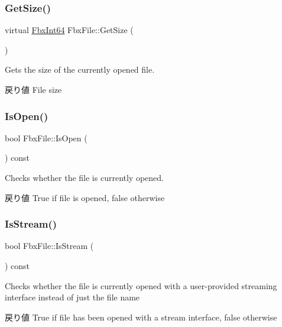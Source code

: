 \subsubsection{\texorpdfstring{Get\+Size()}{GetSize()}}
{\footnotesize\ttfamily virtual \hyperlink{fbxtypes_8h_ac7e1334c7c6aacc9c8a9dccddebb4368}{Fbx\+Int64} Fbx\+File\+::\+Get\+Size (\begin{DoxyParamCaption}{ }\end{DoxyParamCaption})\hspace{0.3cm}{\ttfamily [virtual]}}

Gets the size of the currently opened file. \begin{DoxyReturn}{戻り値}
File size 
\end{DoxyReturn}
\mbox{\label{class_fbx_file_acf436397d99f8b7fb5baf5b32eac26b1}} 
\subsubsection{\texorpdfstring{Is\+Open()}{IsOpen()}}
{\footnotesize\ttfamily bool Fbx\+File\+::\+Is\+Open (\begin{DoxyParamCaption}{ }\end{DoxyParamCaption}) const}

Checks whether the file is currently opened. \begin{DoxyReturn}{戻り値}
True if file is opened, false otherwise 
\end{DoxyReturn}
\mbox{\label{class_fbx_file_ae515a0ebd07a7ebedd0a62b5299cd417}} 
\subsubsection{\texorpdfstring{Is\+Stream()}{IsStream()}}
{\footnotesize\ttfamily bool Fbx\+File\+::\+Is\+Stream (\begin{DoxyParamCaption}{ }\end{DoxyParamCaption}) const}

Checks whether the file is currently opened with a user-\/provided streaming interface instead of just the file name \begin{DoxyReturn}{戻り値}
True if file has been opened with a stream interface, false otherwise 
\end{DoxyReturn}
\mbox{\label{class_fbx_file_a1942c2245eabf7f0507118226af13727}} 
